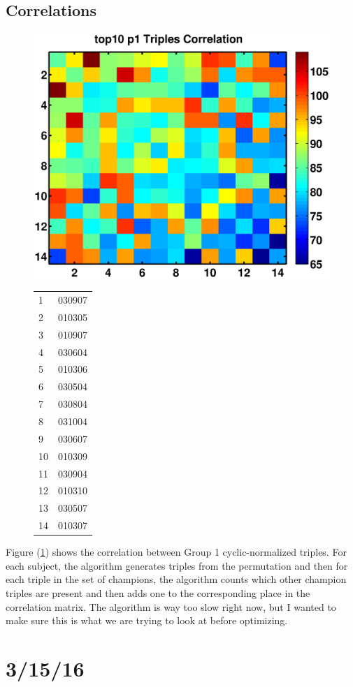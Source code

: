 \documentclass[11pt]{article}
\begin{document}
\subsection{Correlations}
\begin{figure}
\label{fig:corr1}
\includegraphics[width=.5\textwidth]{pictures/top10_p1_trips_corr.eps}
\begin{tabular}{|l|l|}
\hline
1&030907\\
2&010305\\
3&010907\\
4&030604\\
5&010306\\
6&030504\\
7&030804\\
8&031004\\
9&030607\\
10&010309\\
11&030904\\
12&010310\\
13&030507\\
14&010307\\
\hline
\end{tabular}
\caption{}
\end{figure}
Figure (\ref{fig:corr1}) shows the correlation between Group 1 cyclic-normalized triples. For each subject, the algorithm generates triples from the permutation and then for each triple in the set of champions, the algorithm counts which other champion triples are present and then adds one to the corresponding place in the correlation matrix. The algorithm is way too slow right now, but I wanted to make sure this is what we are trying to look at before optimizing.

\section{3/15/16}
\end{document}

